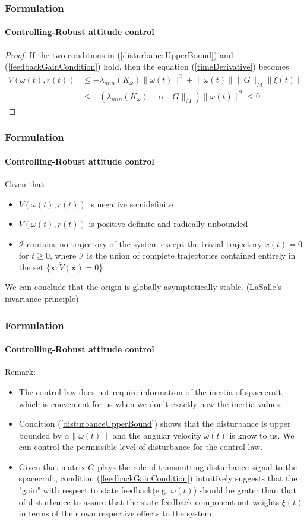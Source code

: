\documentclass{beamer}
\begin{document}
\begin{frame}
\frametitle{Formulation}
\framesubtitle{Controlling-Robust attitude control}
\begin{proof}
	If the two conditions in (\ref{disturbanceUpperBound}) and (\ref{feedbackGainCondition}) hold, then the equation (\ref{timeDerivative}) becomes
	\begin{equation}
	\begin{split}
	\dot{V}(\omega(t),r(t))&\leq -\lambda_{min}(K_{\omega})\lVert\omega(t)\rVert^{2}+\lVert\omega(t)\rVert\lVert G\rVert_{M}\lVert\xi(t)\rVert\\
	&\leq -(\lambda_{min}(K_{\omega})-\alpha\lVert G\rVert_{M})\lVert \omega(t)\rVert^{2}\leq 0
	\end{split}
	\end{equation}
\end{proof}
\end{frame}

\begin{frame}
\frametitle{Formulation}
\framesubtitle{Controlling-Robust attitude control}
Given that 
\begin{itemize}
	\item $\dot{V}(\omega(t),r(t))$ is negative semidefinite
	\item $V(\omega(t),r(t))$ is positive definite and radically unbounded
	\item ${\mathcal {I}}$ contains no trajectory of the system except the trivial trajectory $x ( t ) = 0$ for $t\geq 0$, where ${\mathcal {I}}$ is the union of complete trajectories contained entirely in the set $\{\mathbf x : \dot{V}( \mathbf x) = 0 \}$
\end{itemize}
We can conclude that the origin is globally asymptotically stable. (LaSalle's invariance principle)
\end{frame}

\begin{frame}
\frametitle{Formulation}
\framesubtitle{Controlling-Robust attitude control}
Remark:
\begin{itemize}
	\item The control law does not require information of the inertia of spacecraft, which is convenient for us when we don't exactly now the inertia values. 
	\item Condition (\ref{disturbanceUpperBound}) shows that the disturbance is upper bounded by $\alpha\lVert\omega(t)\rVert$ and the angular velocity $\omega(t)$ is know to us. We can control the permissible level of disturbance for the control law. 
	\item Given that matrix $G$ plays the role of transmitting disturbance signal to the spacecraft, condition (\ref{feedbackGainCondition}) intuitively suggests that the "gain" with respect to state feedback(e.g. $\omega(t)$) should be grater than that of disturbance to assure that the state feedback component out-weights $\xi(t)$ in terms of their own respective effects to the system. 
\end{itemize}
\end{frame}
\end{document}
